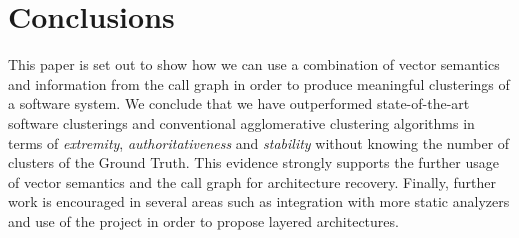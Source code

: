 \documentclass[sigconf,review, anonymous]{acmart}
\begin{document}
\section{Conclusions} This paper is set out to show how we can use a combination of vector semantics
and information from the call graph in order to produce meaningful clusterings of a software system.
We conclude that we have outperformed state-of-the-art software clusterings and conventional
agglomerative clustering algorithms 
in terms of \emph{extremity}, \emph{authoritativeness} and \emph{stability} 
without knowing the number of clusters of the Ground Truth. This evidence strongly
supports the further usage of vector semantics and the call graph for architecture recovery.
Finally, further work is encouraged in several areas such as 
integration with more static analyzers and use of the project in order to propose layered architectures.











\newpage


\end{document}
